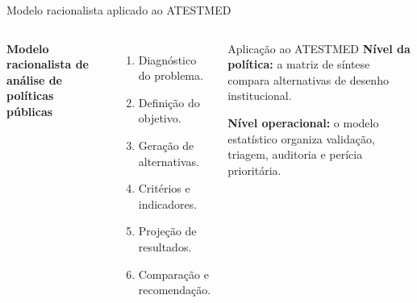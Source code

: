 \documentclass[presentation,aspectratio=169]{beamer}
\begin{document}
\begin{frame}[t]{Modelo racionalista aplicado ao ATESTMED}
\begin{columns}[T,onlytextwidth]
{\large\textbf{Modelo racionalista de análise de políticas públicas}}\par\vspace{0.34cm}
\begin{enumerate}\setlength\itemsep{0.35em}
\item Diagnóstico do problema.
\item Definição do objetivo.
\item Geração de alternativas.
\item Critérios e indicadores.
\item Projeção de resultados.
\item Comparação e recomendação.
\end{enumerate}
\begin{block}{Aplicação ao ATESTMED}\small
\textbf{Nível da política:} a matriz de síntese compara alternativas de desenho institucional.\par\vspace{0.35em}
\textbf{Nível operacional:} o modelo estatístico organiza validação, triagem, auditoria e perícia prioritária.
\end{block}
\vspace{0.18cm}
\end{columns}
\end{frame}
\end{document}
